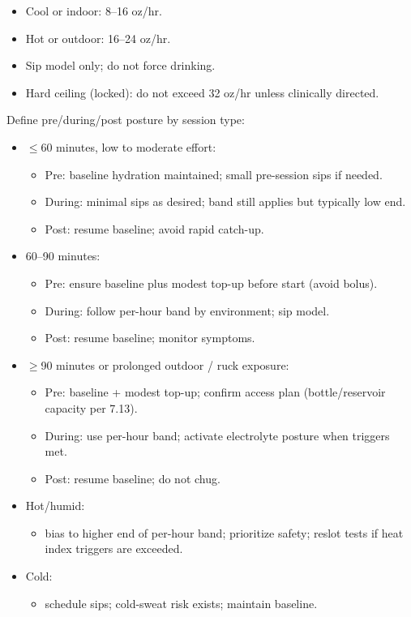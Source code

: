 \documentclass[10pt]{article}
\begin{document}
\begin{itemize}
\item Cool or indoor: 8–16 oz/hr.
\item Hot or outdoor: 16–24 oz/hr.
\item Sip model only; do not force drinking.
\item Hard ceiling (locked): do not exceed 32 oz/hr unless clinically directed.
\end{itemize}

Define pre/during/post posture by session type:

\begin{itemize}
\item $\leq$60 minutes, low to moderate effort:
  \begin{itemize}
  \item Pre: baseline hydration maintained; small pre-session sips if needed.
  \item During: minimal sips as desired; band still applies but typically low end.
  \item Post: resume baseline; avoid rapid catch-up.
  \end{itemize}
\item 60–90 minutes:
  \begin{itemize}
  \item Pre: ensure baseline plus modest top-up before start (avoid bolus).
  \item During: follow per-hour band by environment; sip model.
  \item Post: resume baseline; monitor symptoms.
  \end{itemize}
\item $\geq$90 minutes or prolonged outdoor / ruck exposure:
  \begin{itemize}
  \item Pre: baseline + modest top-up; confirm access plan (bottle/reservoir capacity per 7.13).
  \item During: use per-hour band; activate electrolyte posture when triggers met.
  \item Post: resume baseline; do not chug.
  \end{itemize}
\item Hot/humid:
  \begin{itemize}
  \item bias to higher end of per-hour band; prioritize safety; reslot tests if heat index triggers are exceeded.
  \end{itemize}
\item Cold:
  \begin{itemize}
  \item schedule sips; cold-sweat risk exists; maintain baseline.
  \end{itemize}
\end{itemize}
\end{document}
